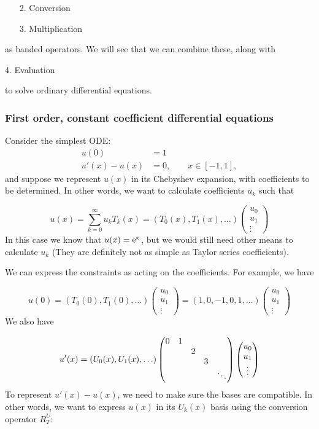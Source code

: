 \documentclass[12pt,landscape]{article}
\def\E{ {\rm e} }
\begin{document}
{\begin{itemize}
\item[2. ] Conversion


\item[3. ] Multiplication

\end{itemize}
as banded operators. We will see that we can combine these, along with

4. Evaluation

to solve ordinary differential equations.

\subsubsection{First order, constant coefficient differential equations}
Consider the simplest ODE:
\begin{align*}
u(0) &= 1 \\
u'(x) - u(x) &= 0, \qquad x \in [-1, 1],
\end{align*}
and suppose we represent $u(x)$ in its Chebyshev expansion, with coefficients to be determined. In other words, we want to calculate coefficients $u_k$ such that

\[
u(x) = \sum_{k=0}^\infty u_k T_k(x) = (T_0(x), T_1(x), \ldots) \begin{pmatrix} u_0 \\ u_1 \\ \vdots \end{pmatrix}
\]
In this case we know that $u(x) = \E^x$, but we would still need other means to calculate $u_k$ (They are definitely not as simple as Taylor series coefficients).

We can express the constraints as acting on the coefficients. For example, we have

\[
u(0) = (T_0(0), T_1(0), \ldots) \begin{pmatrix} u_0\\u_1\\\vdots \end{pmatrix} = (1,0,-1,0,1,\ldots)  \begin{pmatrix} u_0\\u_1\\\vdots \end{pmatrix}
\]
We also have

\[
u'(x) = (U_0(x),U_1(x),\ldots) \begin{pmatrix}
0 & 1 \cr
&& 2 \cr
&&& 3 \cr
&&&&\ddots
\end{pmatrix}\begin{pmatrix} u_0\\u_1\\\vdots \end{pmatrix}
\]
To represent $u'(x) - u(x)$, we need to make sure the bases are compatible. In other words, we want to express $u(x)$ in its $U_k(x)$ basis using the conversion operator $R_T^{U}$:

}
\end{document}
